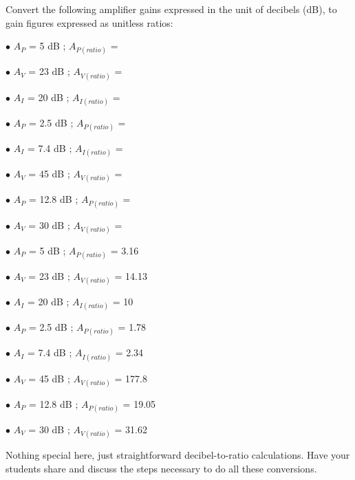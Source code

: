 

Convert the following amplifier gains expressed in the unit of decibels (dB), to gain figures expressed as unitless ratios:

\medskip
\goodbreak
\item{$\bullet$} $A_P$ = 5 dB ; $A_{P(ratio)}$ = 
\item{$\bullet$} $A_V$ = 23 dB ; $A_{V(ratio)}$ = 
\item{$\bullet$} $A_I$ = 20 dB ; $A_{I(ratio)}$ = 
\item{$\bullet$} $A_P$ = 2.5 dB ; $A_{P(ratio)}$ = 
\item{$\bullet$} $A_I$ = 7.4 dB ; $A_{I(ratio)}$ = 
\item{$\bullet$} $A_V$ = 45 dB ; $A_{V(ratio)}$ = 
\item{$\bullet$} $A_P$ = 12.8 dB ; $A_{P(ratio)}$ = 
\item{$\bullet$} $A_V$ = 30 dB ; $A_{V(ratio)}$ = 
\medskip







\medskip
\goodbreak
\item{$\bullet$} $A_P$ = 5 dB ; $A_{P(ratio)}$ = 3.16
\item{$\bullet$} $A_V$ = 23 dB ; $A_{V(ratio)}$ = 14.13
\item{$\bullet$} $A_I$ = 20 dB ; $A_{I(ratio)}$ = 10
\item{$\bullet$} $A_P$ = 2.5 dB ; $A_{P(ratio)}$ = 1.78
\item{$\bullet$} $A_I$ = 7.4 dB ; $A_{I(ratio)}$ = 2.34
\item{$\bullet$} $A_V$ = 45 dB ; $A_{V(ratio)}$ = 177.8
\item{$\bullet$} $A_P$ = 12.8 dB ; $A_{P(ratio)}$ = 19.05
\item{$\bullet$} $A_V$ = 30 dB ; $A_{V(ratio)}$ = 31.62
\medskip







Nothing special here, just straightforward decibel-to-ratio calculations.  Have your students share and discuss the steps necessary to do all these conversions.





